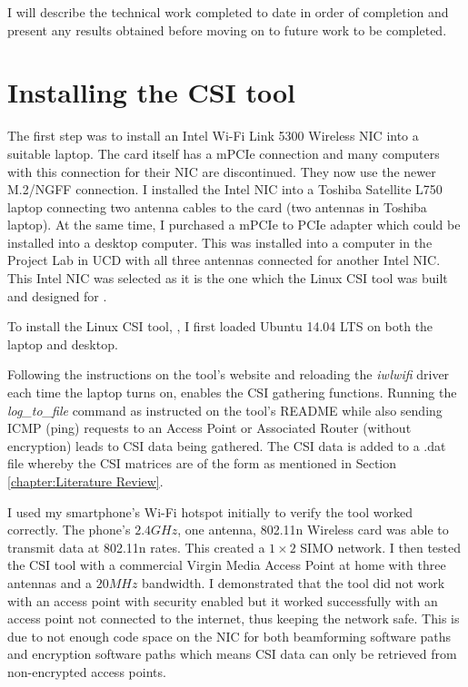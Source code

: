 I will describe the technical work completed to date in order of completion and present any results obtained before moving on to future work to be completed. 
\section{Installing the CSI tool}
The first step was to install an Intel Wi-Fi Link 5300 Wireless NIC into a suitable laptop. The card itself has a mPCIe connection and many computers with this connection for their NIC are discontinued. They now use the newer M.2/NGFF connection. I installed the Intel NIC into a Toshiba Satellite L750 laptop connecting two antenna cables to the card (two antennas in Toshiba laptop). At the same time, I purchased a mPCIe to PCIe adapter which could be installed into a desktop computer. This was installed into a computer in the Project Lab in UCD with all three antennas connected for another Intel NIC. This Intel NIC was selected as it is the one which the Linux CSI tool was built and designed for \citep{Halperin_csitool}. \par
To install the Linux CSI tool, \cite{Halperin_csitool}, I first loaded Ubuntu 14.04 LTS on both the laptop and desktop. 
\begin{comment}As mentioned previously, the Linux CSI tool is built to work with the Intel Wi-Fi Link 5300 using customised Intel firmware and customised versions of the \textit{iwlwifi} open-source driver \citep{Halperin_csitool}. \end{comment}
Following the instructions on the tool's website and reloading the \textit{iwlwifi} driver each time the laptop turns on, enables the CSI gathering functions. Running the \textit{log\_to\_file} command as instructed on the tool's README while also sending ICMP (ping) requests to an Access Point or Associated Router (without encryption) leads to CSI data being gathered. The CSI data is added to a .dat file whereby the CSI matrices are of the form as mentioned in Section \ref{chapter:Literature Review}. \par
I used my smartphone's Wi-Fi hotspot initially to verify the tool worked correctly. The phone's $2.4GHz$, one antenna, 802.11n Wireless card was able to transmit data at 802.11n rates. This created a $1\times 2$ SIMO network. I then tested the CSI tool with a commercial Virgin Media Access Point at home with three antennas and a $20MHz$ bandwidth. I demonstrated that the tool did not work with an access point with security enabled but it worked successfully with an access point not connected to the internet, thus keeping the network safe. This is due to not enough code space on the NIC for both beamforming software paths and encryption software paths which means CSI data can only be retrieved from non-encrypted access points.  \par 
